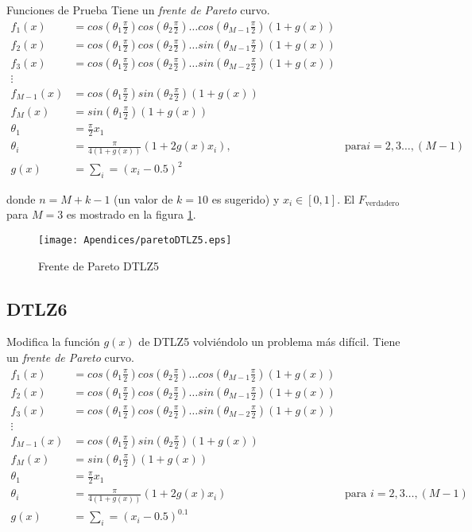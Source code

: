 \begin{chapter}{Funciones de Prueba}
Tiene un {\it frente de Pareto}  curvo.\\


\begin{align*}
f_1(x)&=cos(\theta_1\frac{\pi}{2})cos(\theta_2\frac{\pi}{2})\hdots cos(\theta_{M-1}\frac{\pi}{2})(1+g(x))\\
f_2(x)&=cos(\theta_1\frac{\pi}{2})cos(\theta_2\frac{\pi}{2})\hdots sin(\theta_{M-1}\frac{\pi}{2})(1+g(x))\\
f_3(x)&=cos(\theta_1\frac{\pi}{2})cos(\theta_2\frac{\pi}{2})\hdots sin(\theta_{M-2}\frac{\pi}{2})(1+g(x))\\
\vdots&\\
f_{M-1}(x)&=cos(\theta_1\frac{\pi}{2})sin(\theta_2\frac{\pi}{2})(1+g(x))\\
f_{M}(x)&=sin(\theta_1\frac{\pi}{2})(1+g(x))\\
\theta_1&=\frac{\pi}{2}x_1\\
\theta_i&=\frac{\pi}{4(1+g(x))}(1+2g(x)x_i),  &\text{para} i=2,3\dots,(M-1)\\
g(x)&=\sum_i=(x_i-0.5)^2
\end{align*}


donde $n=M+k-1$ (un valor de $k=10$ es sugerido) y $x_i\in[0,1]$. El $F_\text{verdadero}$ para $M=3$ es mostrado en la figura \ref{fig:DTLZ5}. 

\begin{figure}[h!]
 \centering
\texttt{[image: Apendices/paretoDTLZ5.eps]}
\caption{Frente de Pareto DTLZ5}
\label{fig:DTLZ5}
\end{figure}




\subsection*{DTLZ6}


Modifica la funci\'on $g(x)$ de DTLZ5 volvi\'endolo un problema m\'as dif\'icil. Tiene un {\it frente de Pareto}  curvo.\\


\begin{align*}
f_1(x)&=cos(\theta_1\frac{\pi}{2})cos(\theta_2\frac{\pi}{2})\hdots cos(\theta_{M-1}\frac{\pi}{2})(1+g(x))\\
f_2(x)&=cos(\theta_1\frac{\pi}{2})cos(\theta_2\frac{\pi}{2})\hdots sin(\theta_{M-1}\frac{\pi}{2})(1+g(x))\\
f_3(x)&=cos(\theta_1\frac{\pi}{2})cos(\theta_2\frac{\pi}{2})\hdots sin(\theta_{M-2}\frac{\pi}{2})(1+g(x))\\
\vdots&\\
f_{M-1}(x)&=cos(\theta_1\frac{\pi}{2})sin(\theta_2\frac{\pi}{2})(1+g(x))\\
f_{M}(x)&=sin(\theta_1\frac{\pi}{2})(1+g(x))\\
\theta_1&=\frac{\pi}{2}x_1\\
\theta_i&=\frac{\pi}{4(1+g(x))}(1+2g(x)x_i)  &\text{para } i=2,3\dots,(M-1)\\
g(x)&=\sum_i=(x_i-0.5)^0.1
\end{align*}



\end{chapter}
